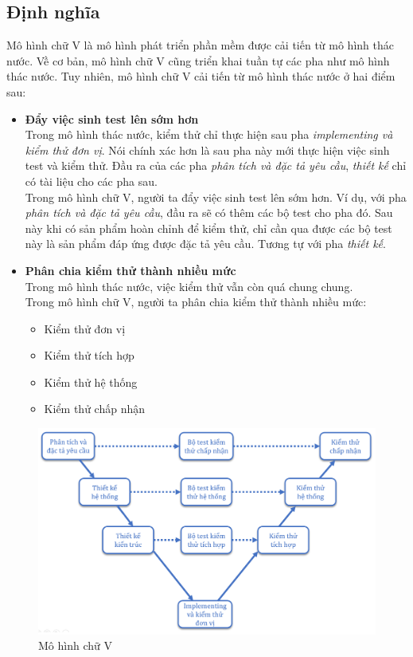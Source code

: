\documentclass[14pt]{extarticle}
\begin{document}
\subsection{Định nghĩa}
Mô hình chữ V là mô hình phát triển phần mềm được cải tiến từ
mô hình thác nước. Về cơ bản, mô hình chữ V cũng triển khai tuần tự
các pha như mô hình thác nước. Tuy nhiên, mô hình chữ V cải tiến
từ mô hình thác nước ở hai điểm sau:
\begin{itemize}
  \item \textbf{Đẩy việc sinh test lên sớm hơn}\\
        Trong mô hình thác nước, kiểm thử chỉ thực hiện sau pha \textit{implementing
          và kiểm thử đơn vị}. Nói chính xác hơn là sau pha này mới thực hiện
        việc sinh test và kiểm thử. Đầu ra của các pha \textit{phân tích và đặc tả
          yêu cầu}, \textit{thiết kế} chỉ có tài liệu cho các pha sau. \\
        Trong mô hình chữ V, người ta đẩy việc sinh test lên sớm hơn. Ví dụ,
        với pha \textit{phân tích và đặc tả yêu cầu}, đầu ra sẽ có thêm các bộ test
        cho pha đó. Sau này khi có sản phẩm hoàn chỉnh để kiểm thử, chỉ
        cần qua được các bộ test này là sản phẩm đáp ứng được đặc tả yêu cầu.
        Tương tự với pha \textit{thiết kế}.

  \item \textbf{Phân chia kiểm thử thành nhiều mức}\\
        Trong mô hình thác nước, việc kiểm thử vẫn còn quá chung chung.\\
        Trong mô hình chữ V, người ta phân chia kiểm thử thành nhiều mức:
        \begin{itemize}
          \item Kiểm thử đơn vị
          \item Kiểm thử tích hợp
          \item Kiểm thử hệ thống
          \item Kiểm thử chấp nhận
        \end{itemize}

\end{itemize}
\begin{figure}[h]
  \centering
  \includegraphics[width=\textwidth]{v-model.png}
  \caption{Mô hình chữ V}
  \label{fig:v-model}
\end{figure}
\end{document}
